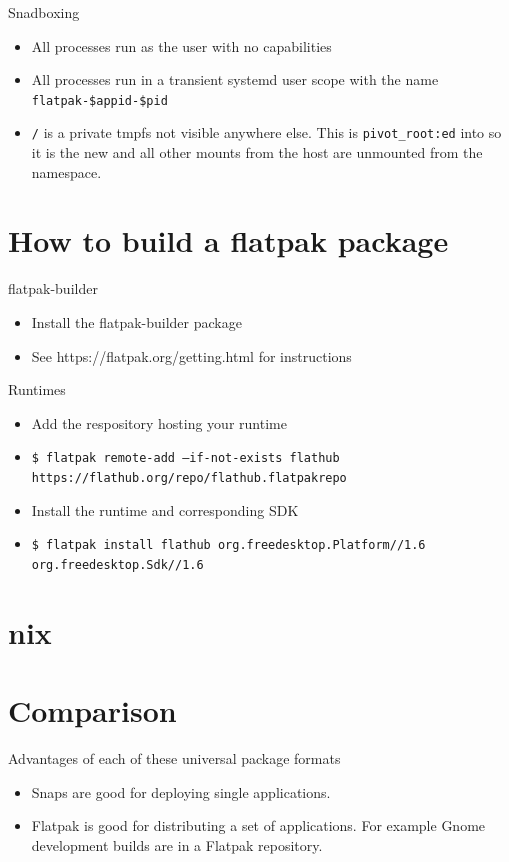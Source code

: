 \documentclass{lug}
\begin{document}
\begin{frame}{Snadboxing}
    \begin{itemize}
        \item All processes run as the user with no capabilities
        \item All processes run in a transient systemd user scope with the name \texttt{flatpak-\$appid-\$pid}
        \item \texttt{/} is a private tmpfs not visible anywhere else. This is \texttt{pivot\_root:ed} into so it is the new  and all other mounts from the host are unmounted from the namespace.
    \end{itemize}
\end{frame}


\section{How to build a flatpak package}

\begin{frame}{flatpak-builder}
    \begin{itemize}
        \item Install the flatpak-builder package
        \item See https://flatpak.org/getting.html for instructions
    \end{itemize}
\end{frame}

\begin{frame}{Runtimes}
    \begin{itemize}
        \item Add the respository hosting your runtime 
        \item\texttt{\$\ flatpak remote-add --if-not-exists flathub https://flathub.org/repo/flathub.flatpakrepo}
        \item Install the runtime and corresponding SDK
        \item\texttt{\$\ flatpak install flathub org.freedesktop.Platform//1.6 org.freedesktop.Sdk//1.6}
    \end{itemize}
\end{frame}


\section{nix}

\section{Comparison}
\begin{frame}{Advantages of each of these universal package formats}
    \begin{itemize}
        \item Snaps are good for deploying single applications.
        \item Flatpak is good for distributing a set of applications. For
            example Gnome development builds are in a Flatpak repository.
    \end{itemize}
\end{frame}
\end{document}
